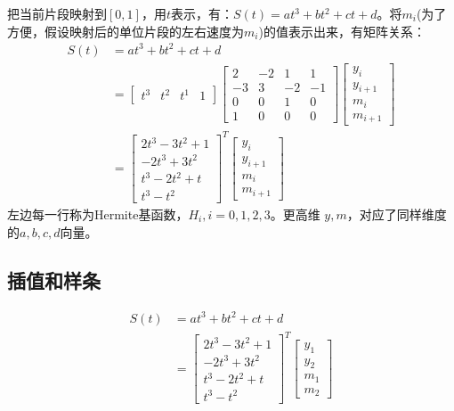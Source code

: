 \documentclass[lang=cn,newtx,10pt,scheme=chinese]{elegantbook}
\begin{document}
把当前片段映射到$[0,1]$，用$t$表示，有：$S(t)=at^3 + bt^2 + ct + d$。将$m_i$(为了
方便，假设映射后的单位片段的左右速度为$m_i$)的值表示出来，有矩阵关系：
\begin{equation}
  \begin{aligned}
  S(t) & =a t^3+b t^2+c t+d \\
  & =\left[\begin{array}{llll}
  t^3 & t^2 & t^1 & 1
  \end{array}\right]\left[\begin{array}{cccc}
  2 & -2 & 1 & 1 \\
  -3 & 3 & -2 & -1 \\
  0 & 0 & 1 & 0 \\
  1 & 0 & 0 & 0
  \end{array}\right]\left[\begin{array}{l}
  y_i \\
  y_{i+1} \\
  m_i \\
  m_{i+1}
  \end{array}\right] \\
  & =\left[\begin{array}{c}
  2 t^3-3 t^2+1 \\
  -2 t^3+3 t^2 \\
  t^3-2 t^2+t \\
  t^3-t^2
  \end{array}\right]^T\left[\begin{array}{l}
  y_i \\
  y_{i+1} \\
  m_i \\
  m_{i+1}
  \end{array}\right]
  \end{aligned}
\end{equation}
左边每一行称为Hermite基函数，$H_i, i=0, 1, 2, 3$。更高维
$y, m$，对应了同样维度的$a, b, c, d$向量。

\subsection{插值和样条}
\begin{equation}
  \begin{aligned}
  S(t) & =a t^3+b t^2+c t+d \\
  & =\left[\begin{array}{c}
  2 t^3-3 t^2+1 \\
  -2 t^3+3 t^2 \\
  t^3-2 t^2+t \\
  t^3-t^2
  \end{array}\right]^T\left[\begin{array}{l}
  y_1 \\
  y_2 \\
  m_1 \\
  m_2
  \end{array}\right]
  \end{aligned}
\end{equation}
\end{document}
